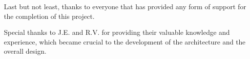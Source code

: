 Last but not least, thanks to everyone that has provided any form of support for the completion of this project.

Special thanks to J.E. and R.V. for providing their valuable knowledge and experience, which became crucial to the development of the architecture and the overall design.